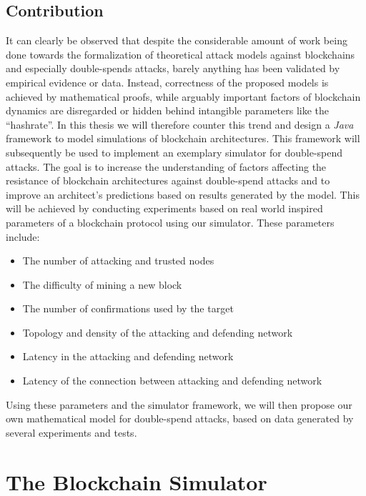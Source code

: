 \documentclass[a4paper,12pt,twoside]{report}
\begin{document}
\section{Contribution}
It can clearly be observed that despite the considerable amount of work being done towards the formalization of theoretical attack models against blockchains and especially double-spends attacks, barely anything has been validated by empirical evidence or data. Instead, correctness of the proposed models is achieved by mathematical proofs, while arguably important factors of blockchain dynamics are disregarded or hidden behind intangible parameters like the ``hashrate''. In this thesis we will therefore counter this trend and design a \textit{Java} framework to model simulations of blockchain architectures. This framework will subsequently be used to implement an exemplary simulator for double-spend attacks. The goal is to increase the understanding of factors affecting the resistance of blockchain architectures against double-spend attacks and to improve an architect's predictions based on results generated by the model. This will be achieved by conducting experiments based on real world inspired parameters of a blockchain protocol using our simulator. These parameters include:
\begin{itemize}
\item The number of attacking and trusted nodes
\item The difficulty of mining a new block
\item The number of confirmations used by the target
\item Topology and density of the attacking and defending network
\item Latency in the attacking and defending network
\item Latency of the connection between attacking and defending network
\end{itemize}
Using these parameters and the simulator framework, we will then propose our own mathematical model for double-spend attacks, based on data generated by several experiments and tests.

\chapter{The Blockchain Simulator} \label{simulator}
\end{document}
